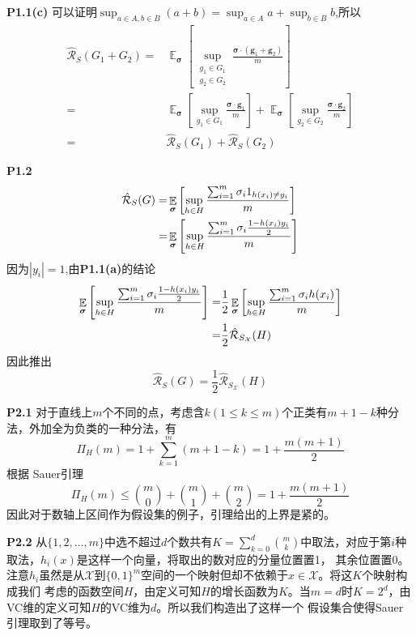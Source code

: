 \documentclass{ctexart}
\DeclareMathOperator*\E{\mathbb{E}}
\begin{document}
\textbf{P1.1(c)}
可以证明$\sup_{a\in A,b\in B}(a+b)=\sup_{a\in A}a+\sup_{b\in B}b$,所以
\begin{align*}
\hat{\mathcal{R}}_S(G_1+G_2)=&\E_{\bm{\sigma}}\left[\sup_{\substack{g_1\in G_1\\g_2\in G_2}}\frac{\bm{\sigma}\cdot (\bm{g}_1+\bm{g}_2)}{m}\right]\\
=&\E_{\bm{\sigma}}\left[\sup_{g_1\in G_1}\frac{\bm{\sigma}\cdot \bm{g}_1}{m}\right]+\E_{\bm{\sigma}}\left[\sup_{g_2\in G_2}\frac{\bm{\sigma}\cdot \bm{g}_2}{m}\right]\\
=& \hat{\mathcal{R}}_S(G_1)+\hat{\mathcal{R}}_S(G_2)
\end{align*}

\textbf{P1.2}
\begin{align}\notag
\hat{\mathcal{R}}_S(G)=&\E_{\bm{\sigma}}\left[\sup_{h\in H}\frac{\sum_{i=1}^m \sigma_i 1_{h(x_i)\neq y_i}}{m}\right]\\
=&\E_{\bm{\sigma}}\left[\sup_{h\in H}\frac{\sum_{i=1}^m \sigma_i \frac{1-h(x_i)y_i}{2}}{m}\right]
\end{align}
因为$|y_i|=1$,由\textbf{P1.1(a)}的结论
\begin{align}\notag
\E_{\bm{\sigma}}\left[\sup_{h\in H}\frac{\sum_{i=1}^m \sigma_i \frac{1-h(x_i)y_i}{2}}{m}\right]=&
\frac{1}{2}\E_{\bm{\sigma}}\left[\sup_{h\in H}\frac{\sum_{i=1}^m \sigma_i h(x_i)}{m}\right]\\
=&\frac{1}{2}\hat{\mathcal{R}}_{S_\mathcal{X}}(H)
\end{align}
因此推出
\begin{equation}
\hat{\mathcal{R}}_S(G)=\frac{1}{2}\hat{\mathcal{R}}_{S_\mathcal{X}}(H)
\end{equation}

\textbf{P2.1}
对于直线上$m$个不同的点，考虑含$k(1\leq k \leq m)$个正类有$m+1-k$种分法，外加全为负类的一种分法，有
\begin{equation}
\Pi_H(m)=1+\sum_{k=1}^m (m+1-k)=1+\frac{m(m+1)}{2}
\end{equation}
根据 Sauer引理
\begin{equation}
\Pi_H(m)\leq \binom{m}{0}+\binom{m}{1}+\binom{m}{2}=1+\frac{m(m+1)}{2}
\end{equation}
因此对于数轴上区间作为假设集的例子，引理给出的上界是紧的。

 \textbf{P2.2}
 从$\{1,2,\dots,m\}$中选不超过$d$个数共有$K=\sum_{k=0}^d\binom{m}{k}$中取法，对应于第$i$种取法，$h_i(x)$是这样一个向量，将取出的数对应的分量位置置1，
 其余位置置0。注意$h_i$虽然是从$\mathcal{X}$到$\{0,1\}^m$空间的一个映射但却不依赖于$x\in \mathcal{X}$。将这$K$个映射构成我们
 考虑的函数空间$H$，由定义可知$H$的增长函数为$K$。当$m=d$时$K=2^d$，由VC维的定义可知$H$的VC维为$d$。所以我们构造出了这样一个
 假设集合使得Sauer 引理取到了等号。
\end{document}
